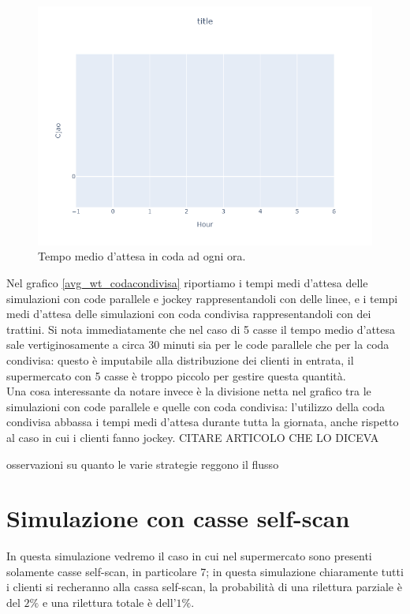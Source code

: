 \begin{figure}[htp!]
	\centering
	\includegraphics[width=12cm]{"images/results/avg_wt_codacondivisa.png"}
	\caption{Tempo medio d'attesa in coda ad ogni ora.}
	\label{fig:avg_wt_codacondivisa}
\end{figure}

Nel grafico \ref{avg_wt_codacondivisa} riportiamo i tempi medi d'attesa delle simulazioni con code parallele e jockey rappresentandoli con delle linee, e i tempi medi d'attesa delle simulazioni con coda condivisa rappresentandoli con dei trattini. Si nota immediatamente che nel caso di 5 casse il tempo medio d'attesa sale vertiginosamente a circa 30 minuti sia per le code parallele che per la coda condivisa: questo è imputabile alla distribuzione dei clienti in entrata, il supermercato con 5 casse è troppo piccolo per gestire questa quantità. \\
Una cosa interessante da notare invece è la divisione netta nel grafico tra le simulazioni con code parallele e quelle con coda condivisa: l'utilizzo della coda condivisa abbassa i tempi medi d'attesa durante tutta la giornata, anche rispetto al caso in cui i clienti fanno jockey. CITARE ARTICOLO CHE LO DICEVA


osservazioni su quanto le varie strategie reggono il flusso

\section{Simulazione con casse self-scan}

In questa simulazione vedremo il caso in cui nel supermercato sono presenti solamente casse self-scan, in particolare 7; in questa simulazione chiaramente tutti i clienti si recheranno alla cassa self-scan, la probabilità di una rilettura parziale è del $2\%$ e una rilettura totale è dell'$1\%$.

